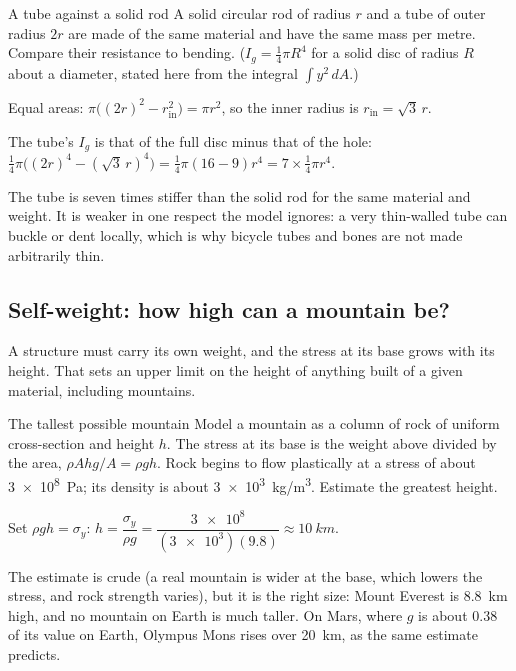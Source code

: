 \begin{exbox}{A tube against a solid rod}\label{ex:solids-tube}
A solid circular rod of radius $r$ and a tube of outer radius $2r$ are made of the same material and have
the same mass per metre. Compare their resistance to bending. ($I_g=\tfrac14\pi R^{4}$ for a solid disc of
radius $R$ about a diameter, stated here from the integral $\int y^2\,dA$.)

 Equal areas: $\pi\big((2r)^{2}-r_{\text{in}}^{2}\big)=\pi r^{2}$, so the inner radius is
$r_{\text{in}}=\sqrt3\,r$.

 The tube's $I_g$ is that of the full disc minus that of the hole:
$\tfrac14\pi\big((2r)^{4}-(\sqrt3\,r)^{4}\big)=\tfrac14\pi(16-9)r^{4}=7\times\tfrac14\pi r^{4}$.

\smallskip
The tube is seven times stiffer than the solid rod for the same material and weight. It is weaker in one
respect the model ignores: a very thin-walled tube can buckle or dent locally, which is why bicycle tubes
and bones are not made arbitrarily thin. 
\end{exbox}

\subsection{Self-weight: how high can a mountain be?}

A structure must carry its own weight, and the stress at its base grows with its height. That sets an
upper limit on the height of anything built of a given material, including mountains.

\begin{exbox}{The tallest possible mountain}\label{ex:solids-mountain}
Model a mountain as a column of rock of uniform cross-section and height $h$. The stress at its base is
the weight above divided by the area, $\rho Ahg/A=\rho gh$. Rock begins to flow plastically at a stress of
about \SI{3e8}{Pa}; its density is about \SI{3e3}{kg/m^3}. Estimate the greatest height.

 Set $\rho gh=\sigma_y$: $h=\dfrac{\sigma_y}{\rho g}=\dfrac{\num{3e8}}{(\num{3e3})(9.8)}\approx\SI{10}{km}$.

\smallskip
The estimate is crude (a real mountain is wider at the base, which lowers the stress, and rock strength
varies), but it is the right size: Mount Everest is \SI{8.8}{km} high, and no mountain on Earth is much
taller. On Mars, where $g$ is about $0.38$ of its value on Earth, Olympus Mons rises over \SI{20}{km},
as the same estimate predicts. 
\end{exbox}


